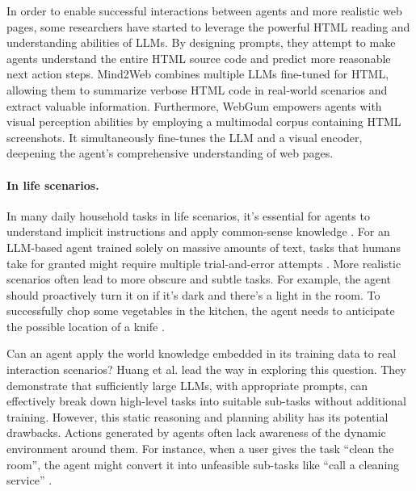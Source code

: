 In order to enable successful interactions between agents and more realistic web pages, some researchers \cite{DBLP:journals/corr/abs-2303-17491, DBLP:journals/corr/abs-2306-07863} have started to leverage the powerful HTML reading and understanding abilities of LLMs. By designing prompts, they attempt to make agents understand the entire HTML source code and predict more reasonable next action steps. Mind2Web \cite{DBLP:journals/corr/abs-2306-06070} combines multiple LLMs fine-tuned for HTML, allowing them to summarize verbose HTML code \cite{DBLP:journals/corr/abs-2307-12856} in real-world scenarios and extract valuable information. Furthermore, WebGum \cite{DBLP:journals/corr/abs-2305-11854} empowers agents with visual perception abilities by employing a multimodal corpus containing HTML screenshots. It simultaneously fine-tunes the LLM and a visual encoder, deepening the agent's comprehensive understanding of web pages.


\paragraph{In life scenarios.}
In many daily household tasks in life scenarios, it's essential for agents to understand implicit instructions and apply common-sense knowledge \cite{DBLP:conf/atal/SinghSM22}. For an LLM-based agent trained solely on massive amounts of text, tasks that humans take for granted might require multiple trial-and-error attempts \cite{DBLP:journals/corr/abs-2012-02757}. More realistic scenarios often lead to more obscure and subtle tasks. For example, the agent should proactively turn it on if it's dark and there's a light in the room. To successfully chop some vegetables in the kitchen, the agent needs to anticipate the possible location of a knife \cite{DBLP:journals/corr/abs-2305-02412}.

Can an agent apply the world knowledge embedded in its training data to real interaction scenarios? Huang et al. \cite{DBLP:conf/icml/HuangAPM22} lead the way in exploring this question. They demonstrate that sufficiently large LLMs, with appropriate prompts, can effectively break down high-level tasks into suitable sub-tasks without additional training. However, this static reasoning and planning ability has its potential drawbacks. Actions generated by agents often lack awareness of the dynamic environment around them. For instance, when a user gives the task ``clean the room'', the agent might convert it into unfeasible sub-tasks like ``call a cleaning service'' \cite{DBLP:journals/corr/abs-2210-04964}.

